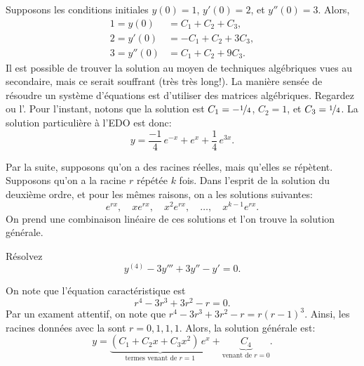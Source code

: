 \begin{example}
	Supposons les conditions initiales $y(0) = 1$, $y'(0) = 2$, et $y''(0) = 3$.  
	Alors,
	\begin{align*}
		1 = y(0) & = C_1 + C_2 + C_3 , \\
		2 = y'(0) & = -C_1 + C_2 + 3C_3 , \\
		3 = y''(0) & = C_1 + C_2 + 9C_3 .
	\end{align*}
	Il est possible de trouver la solution au moyen de techniques algébriques vues au secondaire, mais ce serait souffrant (très très long!). La manière sensée de résoudre un système d'équations est d'utiliser des matrices algébriques. Regardez  ou l'.
	Pour l'instant, notons que la solution est  
	$C_1 = -\nicefrac{1}{4}$, $C_2 = 1$, et $C_3 = \nicefrac{1}{4}$.  
	La solution particulière à l'EDO est donc:
	\begin{equation*}
		y = \frac{-1}{4}\, e^{-x} + e^x + \frac{1}{4}\, e^{3x} .
	\end{equation*}
\end{example}

Par la suite, supposons qu'on a des racines réelles, mais qu'elles se répètent. 
Supposons qu'on a la racine $r$ répétée $k$ fois. 
Dans l'esprit de la solution du deuxième ordre, et pour les mêmes raisons, on a les solutions  suivantes: 
\begin{equation*}
	e^{rx}, \quad xe^{rx}, \quad x^2 e^{rx}, \quad \ldots, \quad x^{k-1} e^{rx} .
\end{equation*}
On prend une combinaison linéaire de ces solutions et l'on trouve la solution générale. 
\begin{example}
	Résolvez
	\begin{equation*}
		y^{(4)} - 3 y''' + 3 y'' - y' =  0 .
	\end{equation*}
	
	On note que l'équation caractéristique est 
	\begin{equation*}
		r^4 - 3r^3 + 3r^2 -r = 0 .
	\end{equation*}
	Par un exament attentif, on note que  $r^4 - 3r^3 + 3r^2 -r = r{(r-1)}^3$.  
	Ainsi, les racines données avec la 
	 sont $r = 0, 1, 1, 1$.  
	Alors, la solution générale est: 
	\begin{equation*}
		y = \underbrace{(C_1 + C_2 x + C_3 x^2)\, e^x}_{\text{termes venant de }r=1} 
			+ \underbrace{C_4}_{\text{venant de } r=0} .
	\end{equation*}
\end{example}

